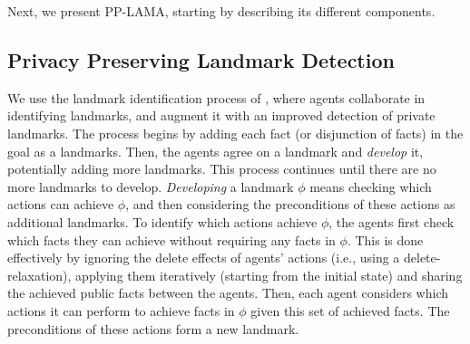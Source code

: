 \documentclass[letterpaper]{article}
\theoremstyle{definition}
\begin{document}
Next, we present PP-LAMA, starting by describing its different components. %


\subsection{Privacy Preserving Landmark Detection}
We use the landmark identification process of \cite{maliah2014privacyPreserving}, where agents collaborate in identifying landmarks, and augment it with an improved detection of private landmarks.
The process begins by adding each fact (or disjunction of facts) in the goal as a landmarks. Then, the agents agree on a landmark and {\em develop} it, potentially adding more landmarks. This process continues until there are no more landmarks to develop.
{\em Developing} a landmark $\phi$ means checking which actions can achieve $\phi$, and then considering the preconditions of these actions as additional landmarks.
To identify which actions achieve $\phi$, the agents first check which facts they can achieve without requiring any facts in $\phi$.
This is done effectively by ignoring the delete effects of agents' actions (i.e., using a delete-relaxation), applying them iteratively (starting from the initial state) and sharing the achieved public facts between the agents. Then, each agent considers which actions it can perform to achieve facts in $\phi$ given this set of achieved facts. The preconditions of these actions form a new landmark.

\end{document}
